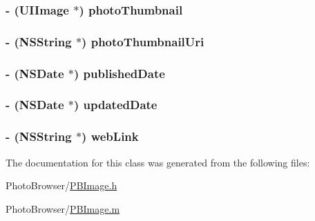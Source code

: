 \label{interface_p_b_image_afd02dd84e4335a88dfb40fa243268f85}
\hypertarget{interface_p_b_image_a246f847f78ea171cf4cce2e6dda32725}{
\subsubsection[{photoThumbnail}]{\setlength{\rightskip}{0pt plus 5cm}-\/ ({\bf UIImage} $\ast$) photoThumbnail}}
\label{interface_p_b_image_a246f847f78ea171cf4cce2e6dda32725}
\hypertarget{interface_p_b_image_a68ff9e3c26d377921ce02942d15f7fbb}{
\subsubsection[{photoThumbnailUri}]{\setlength{\rightskip}{0pt plus 5cm}-\/ ({\bf NSString} $\ast$) photoThumbnailUri}}
\label{interface_p_b_image_a68ff9e3c26d377921ce02942d15f7fbb}
\hypertarget{interface_p_b_image_a7c9e348da15c9c34c347bcc1bafd6fa2}{
\subsubsection[{publishedDate}]{\setlength{\rightskip}{0pt plus 5cm}-\/ (NSDate $\ast$) publishedDate}}
\label{interface_p_b_image_a7c9e348da15c9c34c347bcc1bafd6fa2}
\hypertarget{interface_p_b_image_ad3d43ed4d30cf7a94aea5bd5ae7e0671}{
\subsubsection[{updatedDate}]{\setlength{\rightskip}{0pt plus 5cm}-\/ (NSDate $\ast$) updatedDate}}
\label{interface_p_b_image_ad3d43ed4d30cf7a94aea5bd5ae7e0671}
\hypertarget{interface_p_b_image_ad8ac8644eb2e6a0a2b963a0242235562}{
\subsubsection[{webLink}]{\setlength{\rightskip}{0pt plus 5cm}-\/ ({\bf NSString} $\ast$) webLink}}
\label{interface_p_b_image_ad8ac8644eb2e6a0a2b963a0242235562}


The documentation for this class was generated from the following files:\begin{DoxyCompactItemize}
\item 
PhotoBrowser/\hyperlink{_p_b_image_8h}{PBImage.h}\item 
PhotoBrowser/\hyperlink{_p_b_image_8m}{PBImage.m}\end{DoxyCompactItemize}
